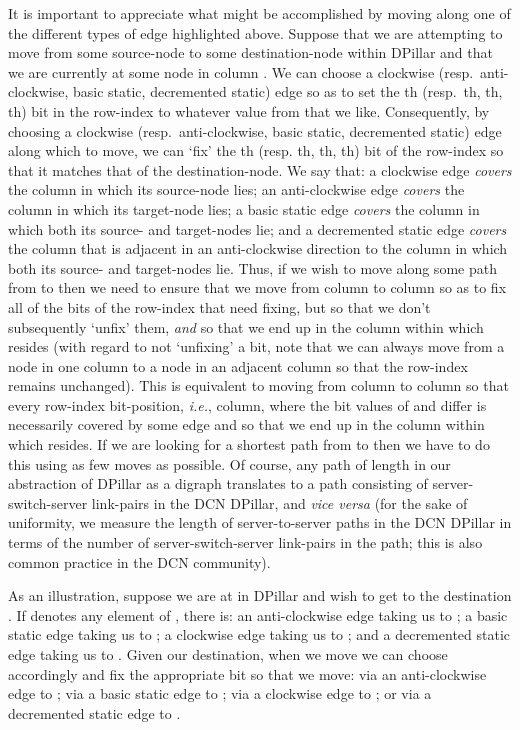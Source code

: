 \documentclass{article}
\begin{document}
It is important to appreciate what might be accomplished by moving along one of
the  different types of edge highlighted above. Suppose that we are
attempting to move from some source-node  to some destination-node 
within DPillar and that we are currently at some node in column . We
can choose a clockwise (resp.\ anti-clockwise, basic static, decremented static)
edge so as to set the th (resp.\ th, th, th) bit in the
row-index to whatever value from  that we like.
Consequently, by choosing a clockwise (resp.\ anti-clockwise, basic static,
decremented static) edge along which to move, we can `fix' the th (resp.
th, th, th) bit of the row-index so that it matches that of the
destination-node. We say that: a clockwise edge \emph{covers\/} the column in
which its source-node lies; an anti-clockwise edge \emph{covers\/} the column in
which its target-node lies; a basic static edge \emph{covers\/} the column in
which both its source- and target-nodes lie; and a decremented static edge
\emph{covers\/} the column that is adjacent in an anti-clockwise direction to
the column in which both its source- and target-nodes lie. Thus, if we wish to
move along some path from  to  then we need to ensure that we move
from column to column so as to fix all of the bits of the row-index that need
fixing, but so that we don't subsequently `unfix' them, \emph{and\/} so that we
end up in the column within which  resides (with regard to not `unfixing' a
bit, note that we can always move from a node in one column to a node in an
adjacent column so that the row-index remains unchanged). This is equivalent to
moving from column to column so that every row-index bit-position, \emph{i.e.},
column, where the bit values of  and  differ is necessarily covered by
some edge and so that we end up in the column within which  resides. If we
are looking for a shortest path from  to  then we have to do this
using as few moves as possible. Of course, any path of length  in our
abstraction of DPillar as a digraph translates to a path consisting of
 server-switch-server link-pairs in the DCN DPillar, and \emph{vice
  versa\/} (for the sake of uniformity, we measure the length of
server-to-server paths in the DCN DPillar in terms of the number of
server-switch-server link-pairs in the path; this is also common practice in the
DCN community).

As an illustration, suppose we are at  in DPillar and wish to get to the destination . If  denotes any element of , there is: an anti-clockwise edge taking us to ; a basic static edge taking us to ; a clockwise edge taking us to ; and a decremented static edge taking us to . Given our destination, when we move we can choose  accordingly and fix the appropriate bit so that we move: via an anti-clockwise edge to ; via a basic static edge to ; via a clockwise edge to ; or via a decremented static edge to .
\end{document}
